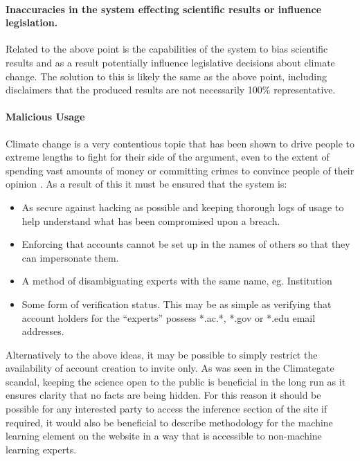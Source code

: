 \documentclass{ecmm427_assignment}
\begin{document}
\paragraph{Inaccuracies in the system effecting scientific results or influence
legislation. }

Related to the above point is the capabilities of the system to bias
scientific results and as a result potentially influence legislative
decisions about climate change. The solution to this is likely the
same as the above point, including disclaimers that the produced results
are not necessarily 100\% representative. 

\paragraph{Malicious Usage}

Climate change is a very contentious topic that has been shown to
drive people to extreme lengths to fight for their side of the argument,
even to the extent of spending vast amounts of money or committing
crimes to convince people of their opinion \cite{nerlich2010climategate}. As a result
of this it must be ensured that the system is:
\begin{itemize}
\item As secure against hacking as possible and keeping thorough logs of
usage to help understand what has been compromised upon a breach.
\item Enforcing that accounts cannot be set up in the names of others so
that they can impersonate them. 
\item A method of disambiguating experts with the same name, eg. Institution
\item Some form of verification status. This may be as simple as verifying
that account holders for the ``experts'' possess {*}.ac.{*}, {*}.gov
or {*}.edu email addresses. 
\end{itemize}
Alternatively to the above ideas, it may be possible to simply restrict
the availability of account creation to invite only. As was seen in
the Climategate scandal, keeping the science open to the public is
beneficial in the long run as it ensures clarity that no facts are
being hidden. For this reason it should be possible for any interested
party to access the inference section of the site if required, it
would also be beneficial to describe methodology for the machine learning
element on the website in a way that is accessible to non-machine
learning experts.
\end{document}
